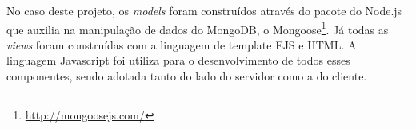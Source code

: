No caso deste projeto, os \emph{models} foram construídos através do pacote do Node.js que auxilia
na manipulação de dados do MongoDB, o Mongoose\footnote{\url{http://mongoosejs.com/}}. Já todas as \emph{views}
foram construídas com a linguagem de template EJS e HTML. A linguagem Javascript foi utiliza para o desenvolvimento
de todos esses componentes, sendo adotada tanto do lado do servidor como a do cliente.
